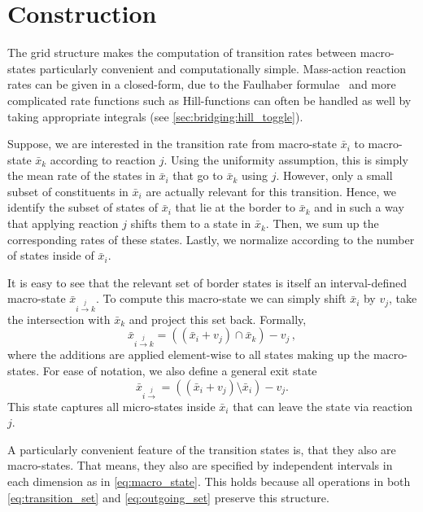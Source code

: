 \section{Construction}
The grid structure makes the computation of transition rates between macro-states particularly convenient and computationally simple.
Mass-action reaction rates can be given in a closed-form,
due to the Faulhaber formulae~\parencite{knuth1993johann} and more complicated rate functions such as Hill-functions can often be handled as well by taking appropriate integrals (see \autoref{sec:bridging:hill_toggle}).

Suppose, we are interested in the transition rate from macro-state $\bar{x}_i$ to macro-state $\bar{x}_k$ according to reaction $j$.
Using the uniformity assumption, this is simply the mean rate of the states in $\bar{x}_i$ that go to $\bar{x}_k$ using $j$.
However, only a small subset of constituents in $\bar{x}_i$ are actually relevant for this transition.
Hence, we identify the subset of states of $\bar{x}_i$ that lie at the border to $\bar{x}_k$ and in such a way that applying reaction $j$ shifts them to a state in $\bar{x}_k$. Then, we sum up the corresponding rates of these states. Lastly, we normalize according to the number of states inside of $\bar{x}_i$.

It is easy to see that the relevant set of border states is itself an
interval-defined macro-state $\bar{x}_{i\xrightarrow{j}k}$.
To compute this macro-state
we can simply shift $\bar{x}_i$ by $v_j$, take the intersection
with $\bar{x}_k$ and project this set back.
Formally,
\begin{equation}\label{eq:transition_set}
    \bar{x}_{i\xrightarrow{j}k} = ((\bar{x}_i + v_j) \cap \bar{x}_k) - v_j\,,
\end{equation}
where the additions are applied element-wise to all states
making up the macro-states.
For ease of notation, we also define a general exit state
\begin{equation}\label{eq:outgoing_set}
    \bar{x}_{i\xrightarrow{j}} = ((\bar{x}_i + v_j) \setminus \bar{x}_i) - v_j.
\end{equation}
This state captures all micro-states inside $\bar{x}_i$ that can leave the state via reaction $j$.

A particularly convenient feature of the transition states is, that they also are macro-states.
That means, they also are specified by independent intervals in each dimension as in \eqref{eq:macro_state}.
This holds because all operations in both \eqref{eq:transition_set} and \eqref{eq:outgoing_set} preserve this structure.


